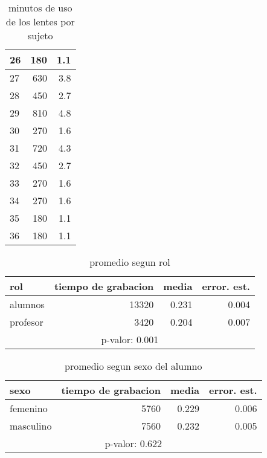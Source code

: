 \documentclass[spanish]{article}
\begin{document}
\begin{table}[h!]
\begin{center}
\begin{tabular}{|l|r|r|}
    26 &              180 &           1.1\\ \hline
    27 &              630 &           3.8\\ \hline
    28 &              450 &           2.7\\ \hline
    29 &              810 &           4.8\\ \hline
    30 &              270 &           1.6\\ \hline
    31 &              720 &           4.3\\ \hline
    32 &              450 &           2.7\\ \hline
    33 &              270 &           1.6\\ \hline
    34 &              270 &           1.6\\ \hline
    35 &              180 &           1.1\\ \hline
    36 &              180 &           1.1\\ \hline
\end{tabular}
\caption{minutos de uso de los lentes por sujeto}
\end{center}
\end{table}

\begin{table}[h!]
\begin{center}
\begin{tabular}{|l|r|r|r|}
\hline
rol      & tiempo de grabacion & media          & error. est.     \\ \hline
alumnos  &               13320 &          0.231 &            0.004\\ \hline
profesor &                3420 &          0.204 &            0.007\\ \hline
\multicolumn{4}{|c|}{p-valor: 0.001} \\ \hline
\end{tabular}
\caption{promedio segun rol}
\end{center}
\end{table}

\begin{table}[h!]
\begin{center}
\begin{tabular}{|l|r|r|r|}
\hline
sexo      & tiempo de grabacion & media          & error. est.     \\ \hline
femenino  &                5760 &          0.229 &            0.006\\ \hline
masculino &                7560 &          0.232 &            0.005\\ \hline
\multicolumn{4}{|c|}{p-valor: 0.622} \\ \hline
\end{tabular}
\caption{promedio segun sexo del alumno}
\end{center}
\end{table}
\end{document}
